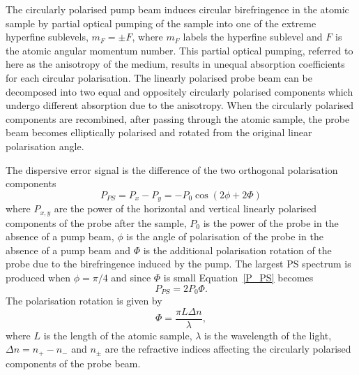 The circularly polarised pump beam induces circular birefringence in the atomic sample by partial optical pumping of the sample into one of the extreme hyperfine sublevels, $m_F=\pm F$, where $m_F$ labels the hyperfine sublevel and $F$ is the atomic angular momentum number.
This partial optical pumping, referred to here as the anisotropy of the medium, results in unequal absorption coefficients for each circular polarisation.
The linearly polarised probe beam can be decomposed into two equal and oppositely circularly polarised components which undergo different absorption due to the anisotropy.
When the circularly polarised components are recombined, after passing through the atomic sample, the probe beam becomes elliptically polarised and rotated from the original linear polarisation angle.

The dispersive error signal is the difference of the two orthogonal polarisation components~\cite{pearman_polarization_2002, hughes_polarization_2009}
\begin{equation}
P_{PS} = P_x-P_y = -P_0 \cos(2\phi+2\Phi)\label{P_PS}
\end{equation}
where $P_{x,y}$ are the power of the horizontal and vertical linearly polarised components of the probe after the sample, $P_0$ is the power of the probe in the absence of a pump beam, $\phi$ is the angle of polarisation of the probe in the absence of a pump beam and $\Phi$ is the additional polarisation rotation of the probe due to the birefringence induced by the pump.
The largest PS spectrum is produced when $\phi=\pi/4$ and since $\Phi$ is small Equation~\ref{P_PS} becomes
\begin{equation}
P_{PS} = 2P_0 \Phi.
\end{equation}
The polarisation rotation is given by
\begin{equation}
\Phi = \frac{\pi L \Delta n}{\lambda},
\end{equation}
where $L$ is the length of the atomic sample, $\lambda$ is the wavelength of the light, $\Delta n = n_+ - n_-$ and $n_\pm$ are the refractive indices affecting the circularly polarised components of the probe beam.

